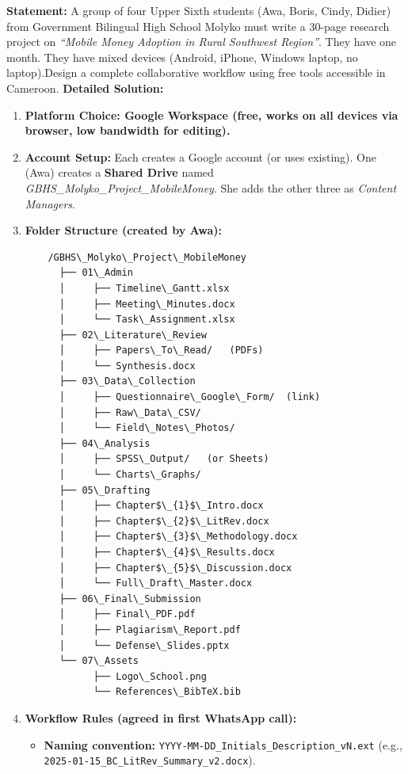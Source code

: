 \documentclass[11pt]{article}
\begin{document}
\begin{exoresolu}
    \textbf{Statement:} A group of four Upper Sixth students (Awa, Boris, Cindy, Didier) from Government Bilingual High School Molyko must write a 30-page research project on \textit{``Mobile Money Adoption in Rural Southwest Region''}. They have one month. They have mixed devices (Android, iPhone, Windows laptop, no laptop).Design a complete collaborative workflow using free tools accessible in Cameroon.
    \tcblower
    \textbf{Detailed Solution:}
    \begin{enumerate}
        \item \textbf{Platform Choice: Google Workspace (free, works on all devices via browser, low bandwidth for editing).}
        \item \textbf{Account Setup:} Each creates a Google account (or uses existing). One (Awa) creates a \textbf{Shared Drive} named \textit{GBHS\_Molyko\_Project\_MobileMoney}. She adds the other three as \textit{Content Managers}.
        \item \textbf{Folder Structure (created by Awa):}
              \begin{verbatim}
    /GBHS\_Molyko\_Project\_MobileMoney
      ├── 01\_Admin
      │     ├── Timeline\_Gantt.xlsx
      │     ├── Meeting\_Minutes.docx
      │     └── Task\_Assignment.xlsx
      ├── 02\_Literature\_Review
      │     ├── Papers\_To\_Read/   (PDFs)
      │     └── Synthesis.docx
      ├── 03\_Data\_Collection
      │     ├── Questionnaire\_Google\_Form/  (link)
      │     ├── Raw\_Data\_CSV/
      │     └── Field\_Notes\_Photos/
      ├── 04\_Analysis
      │     ├── SPSS\_Output/   (or Sheets)
      │     └── Charts\_Graphs/
      ├── 05\_Drafting
      │     ├── Chapter$\_{1}$\_Intro.docx
      │     ├── Chapter$\_{2}$\_LitRev.docx
      │     ├── Chapter$\_{3}$\_Methodology.docx
      │     ├── Chapter$\_{4}$\_Results.docx
      │     ├── Chapter$\_{5}$\_Discussion.docx
      │     └── Full\_Draft\_Master.docx
      ├── 06\_Final\_Submission
      │     ├── Final\_PDF.pdf
      │     ├── Plagiarism\_Report.pdf
      │     └── Defense\_Slides.pptx
      └── 07\_Assets
            ├── Logo\_School.png
            └── References\_BibTeX.bib
              \end{verbatim}
        \item \textbf{Workflow Rules (agreed in first WhatsApp call):}
              \begin{itemize}
                  \item \textbf{Naming convention:} \texttt{YYYY-MM-DD\_Initials\_Description\_vN.ext} (e.g., \texttt{2025-01-15\_BC\_LitRev\_Summary\_v2.docx}).

\end{itemize}
\end{enumerate}
\end{exoresolu}
\end{document}
